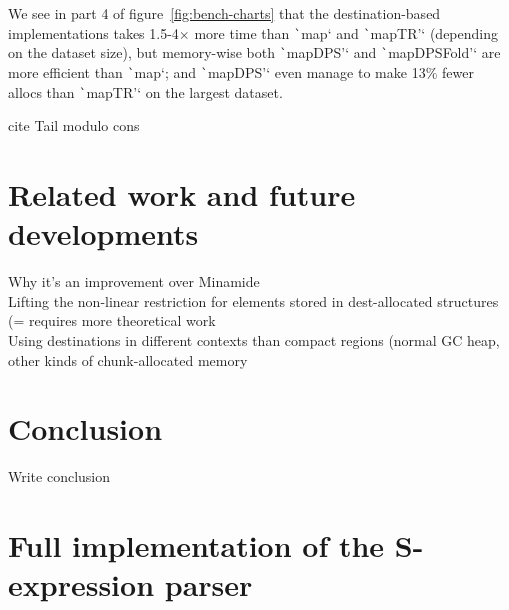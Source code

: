 \documentclass[english]{jflart}
\newcommand{\TODO}[1]{{\color{red}\large #1}}
\begin{document}
We see in part 4 of figure~\ref{fig:bench-charts} that the destination-based implementations takes 1.5-4$\times$ more time than \texttt`map` and \texttt`mapTR'` (depending on the dataset size), but memory-wise both \texttt`mapDPS'` and \texttt`mapDPSFold'` are more efficient than \texttt`map`; and \texttt`mapDPS'` even manage to make 13\% fewer allocs than \texttt`mapTR'` on the largest dataset.

\TODO{cite Tail modulo cons}

\section{Related work and future developments}

\TODO{Why it's an improvement over Minamide}\\
\TODO{Lifting the non-linear restriction for elements stored in dest-allocated structures (= requires more theoretical work}\\
\TODO{Using destinations in different contexts than compact regions (normal GC heap, other kinds of chunk-allocated memory}\\

\section{Conclusion}

\TODO{Write conclusion}

\appendix

\section{Full implementation of the S-expression parser}\label{ann:parse-s-expr}
\end{document}
